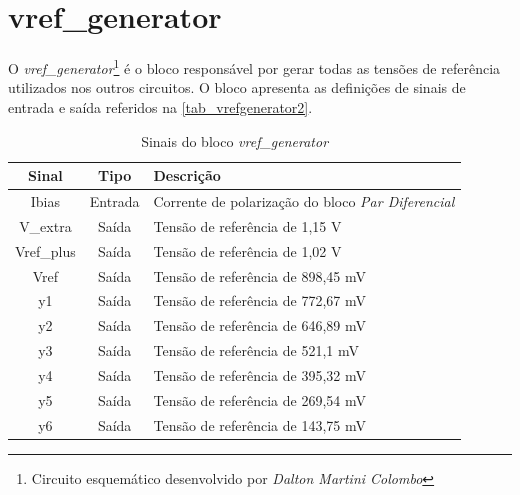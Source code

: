 \renewcommand{\NomeBloco}{\textit{vref\_generator}}
\renewcommand{\NomeBlocoNoUnderline}{vrefgenerator}
\renewcommand{\NomePTab}{tab_\NomeBlocoNoUnderline}
\renewcommand{\NomeSTab}{tab_\NomeBlocoNoUnderline2}
\renewcommand{\NomePFig}{fig_\NomeBlocoNoUnderline}
\renewcommand{\NomeSFig}{fig_\NomeBlocoNoUnderline2}
\renewcommand{\NomeTTab}{tab_\NomeBlocoNoUnderline3}
\renewcommand{\NomeQTab}{tab_\NomeBlocoNoUnderline4}

\section{vref\_generator}

O \textit{\NomeBloco}\footnote{Circuito esquemático desenvolvido por \textit{Dalton Martini Colombo}} \'e o bloco respons\'avel por gerar todas as tensões de refer\^encia utilizados nos outros circuitos. O bloco apresenta as definições de sinais de entrada e sa\'ida referidos na \autoref{\NomeSTab}.

\begin{table}[!h]
\caption{Sinais do bloco \NomeBloco}
\label{\NomeSTab}
\centering
\begin{tabular}{ccl}

    \toprule
    Sinal & Tipo    & Descrição      \\
    \midrule \midrule
    Ibias   & Entrada   & Corrente de polarização do bloco \textit{Par Diferencial} \\
    \midrule
    V\_extra   & Saída   & Tensão de refer\^encia de 1,15 V \\
    \midrule
    Vref\_plus   & Saída   & Tensão de refer\^encia de 1,02 V \\
    \midrule
    Vref   & Saída   & Tensão de refer\^encia de 898,45 mV \\
    \midrule
    y1   & Saída   & Tensão de refer\^encia de 772,67 mV \\
    \midrule
    y2   & Saída   & Tensão de refer\^encia de 646,89 mV \\
    \midrule
    y3   & Saída   & Tensão de refer\^encia de 521,1 mV \\
    \midrule
    y4  & Saída   & Tensão de refer\^encia de 395,32 mV  \\
    \midrule
    y5   & Saída   & Tensão de refer\^encia de 269,54 mV \\
    \midrule
    y6   & Saída   & Tensão de refer\^encia de 143,75 mV \\
    \bottomrule
\end{tabular}
\end{table}

